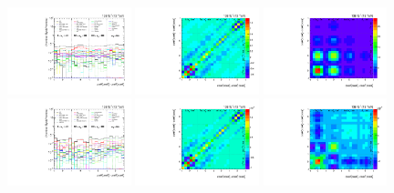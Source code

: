 \begin{figure}[htb]
\begin{center}
 \includegraphics[width=0.32\textwidth]{fig_fullRun2UL/unfolding/combined/deltaSystCombinedlog_rebinnedB_c_Mnk_mttbar.pdf}
 \includegraphics[width=0.32\textwidth]{fig_fullRun2UL/unfolding/combined/StatCovMatrix_rebinnedB_c_Mnk_mttbar.pdf}
 \includegraphics[width=0.32\textwidth]{fig_fullRun2UL/unfolding/combined/TotalSystCovMatrix_rebinnedB_c_Mnk_mttbar.pdf} \\
 \includegraphics[width=0.32\textwidth]{fig_fullRun2UL/unfolding/combined/deltaSystCombinedlogNorm_rebinnedB_c_Mnk_mttbar.pdf}
 \includegraphics[width=0.32\textwidth]{fig_fullRun2UL/unfolding/combined/StatCovMatrixNorm_rebinnedB_c_Mnk_mttbar.pdf}
 \includegraphics[width=0.32\textwidth]{fig_fullRun2UL/unfolding/combined/TotalSystCovMatrixNorm_rebinnedB_c_Mnk_mttbar.pdf} \\

\end{center}
\end{figure}
